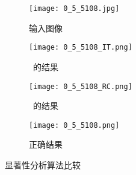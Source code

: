 \begin{figure}[h]
  \centering%
  \begin{subfigure}{0.2\textwidth}
    \texttt{[image: 0\_5\_5108.jpg]}
    \caption{输入图像}
    \label{fig:saliencyInput}
  \end{subfigure}%
  \hspace{0.1in}%
  \begin{subfigure}{0.2\textwidth}
    \texttt{[image: 0\_5\_5108\_IT.png]}
    \caption{~的结果}
    \label{fig:ITRes}
  \end{subfigure}
  \hspace{0.05in}%
   \begin{subfigure}{0.2\textwidth}
    \texttt{[image: 0\_5\_5108\_RC.png]}
    \caption{~的结果}
    \label{fig:RCRes}
  \end{subfigure}
  \hspace{0.05in}%
   \begin{subfigure}{0.2\textwidth}
    \texttt{[image: 0\_5\_5108.png]}
    \caption{正确结果}
    \label{fig:GT}
  \end{subfigure}
  \hspace{0.05in}%
  \caption{显著性分析算法比较}
  \label{fig:SaliencyOverview}
\end{figure}



